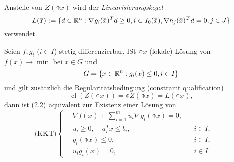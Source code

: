 Anstelle von $Z(\obar{x})$ wird der \emph{Linearisierungskegel}
\[ L( \obar{x} ) := \{ d \in \real^n : \nabla g_i(\obar{x})^T d \ge 0, i \in
  I_0(\obar{x}), \nabla h_j(\obar{x})^T d = 0, j \in J \} \]
verwendet.

\clearpage

\begin{thm} %
  Seien $f,g_i$ ($i \in I$) stetig differenzierbar. ISt $\obar{x}$ (lokale)
  Lösung von $f(x) \to  \min$ bei $x \in G$ und
  \[ G = \{ x \in \mathbb{R}^n : g_i(x) \le 0, i \in I \} \]
  und gilt zusätzlich die Regularitätsbedingung (constraint qualification)
  \[ \tag{CQ} \operatorname{cl}(Z(\obar{x})) = \obar{Z(\obar{x})} =
    L(\obar{x}), \]
  dann ist (2.2) äquivalent zur Existenz einer Lösung von
  \begin{equation} %
    \text{(KKT)} \left\{ \quad \begin{aligned} 
        \nabla f(x) + \sum_{i =1}^m u_i \nabla g_i(\obar{x}) = 0, & \\
        u_i \ge 0, \quad a_i^T x \le b_i, & &i \in I, \\
        g_i(\obar{x}) \le 0, & &i \in I, \\
        u_i g_i(x) = 0, & &i \in I.
      \end{aligned} \qquad \right.
  \end{equation}
\end{thm}
